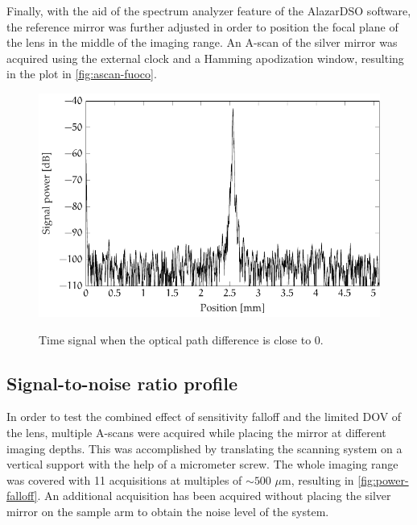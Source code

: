 Finally, with the aid of the spectrum analyzer feature of the AlazarDSO software, the reference mirror was further adjusted in order to position the focal plane of the lens in the middle of the imaging range. An A-scan of the silver mirror was acquired using the external clock and a Hamming apodization window, resulting in the plot in \autoref{fig:ascan-fuoco}.

\begin{figure}[hbt]
	\myfloatalign
	{	\includegraphics[width=0.85\linewidth]{gfx/ch3/fuoco}}
	\caption{Time signal when the optical path difference is close to 0.}\label{fig:ascan-fuoco}
\end{figure}


\subsection{Signal-to-noise ratio profile}
In order to test the combined effect of sensitivity falloff and the limited DOV of the lens, multiple A-scans were acquired while placing the mirror at different imaging depths. This was accomplished by translating the scanning system on a vertical support with the help of a micrometer screw. The whole imaging range was covered with 11 acquisitions at multiples of $\sim 500$ $\mu$m, resulting in \autoref{fig:power-falloff}. An additional acquisition has been acquired without placing the silver mirror on the sample arm to obtain the noise level of the system. 


